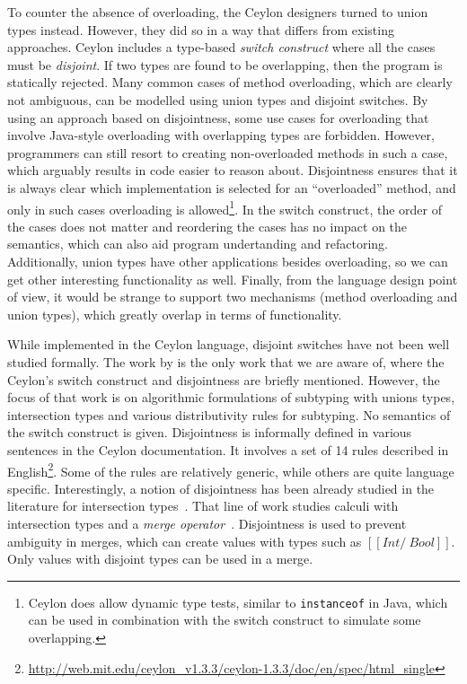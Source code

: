 To counter the absence of overloading, the Ceylon designers turned to
union types instead. However, they did so in a way that differs from
existing approaches. Ceylon includes a type-based 
\emph{switch construct} where all the cases must be \emph{disjoint}.  If
two types are found to be overlapping, then the program is statically
rejected. Many common cases of method overloading, which are clearly
not ambiguous, can be modelled using union types and disjoint switches.
By using an approach based on disjointness, some use cases for
overloading that involve Java-style overloading with
overlapping types are forbidden. However,
programmers can still resort to creating non-overloaded methods in
such a case, which arguably results in code easier to reason about.
Disjointness ensures that it is always
clear which implementation is selected for an ``overloaded'' method,
and only in such cases overloading is allowed\footnote{Ceylon does
  allow dynamic type tests, similar to \lstinline{instanceof} in Java, which can be used
  in combination with the switch construct to simulate some overlapping.}.
In the switch construct,
the order of the cases does not matter and reordering the cases has no
impact on the semantics, which can also aid program undertanding and
refactoring.
Additionally, union types have other applications besides overloading,
so we can get other interesting functionality as well. Finally, from
the language design point of view, it would be strange to support two
mechanisms (method overloading and union types), which greatly overlap
in terms of functionality.

While implemented in the Ceylon language,
disjoint switches have not been well studied formally.
The work by \citet{muehlboeck2018empowering} is the only work that we are aware of,
where the Ceylon's switch construct
and disjointness are briefly mentioned. However, the focus 
of that work is on algorithmic formulations of subtyping
with unions types, intersection types and various distributivity
rules for subtyping. No semantics of the switch construct is given.
Disjointness is informally defined in various sentences in the
Ceylon documentation. It involves a set of 14 rules described in English\footnote{\url{http://web.mit.edu/ceylon_v1.3.3/ceylon-1.3.3/doc/en/spec/html_single}}. Some of the rules are relatively generic, while
others are quite language specific. 
Interestingly, a notion
of disjointness has been already studied in the literature
for intersection types~\cite{oliveira2016disjoint}. That line of work studies calculi
with intersection types and a \textit{merge operator}~\cite{reynolds1988preliminary}. Disjointness
is used to prevent ambiguity in merges, which can create
values with types such as $[[Int /\ Bool]]$. Only values
with disjoint types can be used in a merge.

